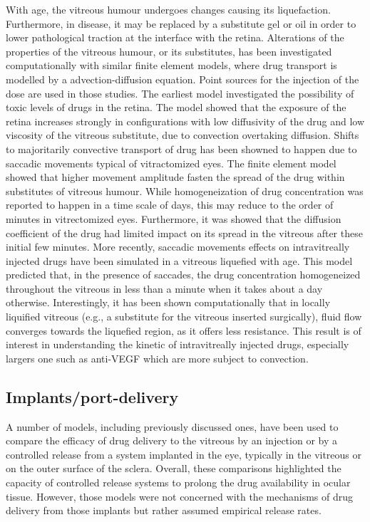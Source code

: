 \documentclass[12pt,a4paper]{journal}
\begin{document}
With age, the vitreous humour undergoes changes causing its liquefaction.
Furthermore, in disease, it may be replaced by a substitute gel or oil in order to lower pathological traction at the interface with the retina.
Alterations of the properties of the vitreous humour, or its substitutes, has been investigated computationally with similar finite element models, where drug transport is modelled by a advection-diffusion equation.\cite{Kathawate_2008,Modareszadeh_2012}
Point sources for the injection of the dose are used in those studies.
The earliest model investigated the possibility of toxic levels of drugs in the retina.\cite{Kathawate_2008}
The model showed that the exposure of the retina increases strongly in configurations with low diffusivity of the drug and low viscosity of the vitreous substitute, due to convection overtaking diffusion.\cite{Kathawate_2008}
Shifts to majoritarily convective transport of drug has been showned to happen due to saccadic movements typical of vitractomized eyes.\cite{Modareszadeh_2012}
The finite element model showed that higher movement amplitude fasten the spread of the drug within substitutes of vitreous humour.
While homogeneization of drug concentration was reported to happen in a time scale of days, this may reduce to the order of minutes in vitrectomized eyes.\cite{Modareszadeh_2012}
Furthermore, it was showed that the diffusion coefficient of the drug had limited impact on its spread in the vitreous after these initial few minutes.\cite{Modareszadeh_2012}
More recently, saccadic movements effects on intravitreally injected drugs have been simulated in a vitreous liquefied with age.\cite{Ferroni_2020}
This model predicted that, in the presence of saccades, the drug concentration homogeneized throughout the vitreous in less than a minute when it takes about a day otherwise.
Interestingly, it has been shown computationally that in locally liquified vitreous (e.g., a substitute for the vitreous inserted surgically), fluid flow converges towards the liquefied region, as it offers less resistance.\cite{Khoobyar_2022}
This result is of interest in understanding the kinetic of intravitreally injected drugs, especially largers one such as anti-VEGF which are more subject to convection.

\subsection*{Implants/port-delivery}

A number of models, including previously discussed ones, have been used to compare the efficacy of drug delivery to the vitreous by an injection or by a controlled release from a system implanted in the eye, typically in the vitreous or on the outer surface of the sclera.\cite{Jooybar_2014,Kathawate_2008,Kavousanakis_2014,Park_2005}
Overall, these comparisons highlighted the capacity of controlled release systems to prolong the drug availability in ocular tissue.
However, those models were not concerned with the mechanisms of drug delivery from those implants but rather assumed empirical release rates.
\end{document}
